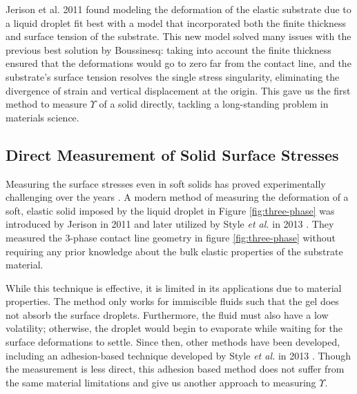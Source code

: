Jerison et al. 2011 \cite{jerison2011deformation} found modeling the deformation of the elastic substrate due to a liquid droplet fit best with a model that incorporated both the finite thickness and surface tension of the substrate. This new model solved many issues with the previous best solution by Boussinesq: taking into account the finite thickness ensured that the deformations would go to zero far from the contact line, and the substrate's surface tension resolves the single stress singularity, eliminating the divergence of strain and vertical displacement at the origin. This gave us the first method to measure $ \Upsilon $ of a solid directly, tackling a long-standing problem in materials science.


\subsection{Direct Measurement of Solid Surface Stresses}
Measuring the surface stresses even in soft solids has proved experimentally challenging over the years \cite{xu2016surface,jensen2015wetting,mondal2015estimation,style2013surface,jagota2012surface,nadermann2013solid,park2014visualization}. A modern method of measuring the deformation of a soft, elastic solid imposed by the liquid droplet in Figure \ref{fig:three-phase} was introduced by Jerison in 2011 \cite{jerison2011deformation} and later utilized by Style \emph{et al.} in 2013 \cite{style2013universal}. They measured the 3-phase contact line geometry in figure \ref{fig:three-phase} without requiring any prior knowledge about the bulk elastic properties of the substrate material. 

While this technique is effective, it is limited in its applications due to material properties. The method only works for immiscible fluids such that the gel does not absorb the surface droplets. Furthermore, the fluid must also have a low volatility; otherwise, the droplet would begin to evaporate while waiting for the surface deformations to settle. Since then, other methods have been developed, including an adhesion-based technique developed by Style \textit{et al.} in 2013 \cite{style2013surface}. Though the measurement is less direct, this adhesion based method does not suffer from the same material limitations and give us another approach to measuring $ \Upsilon $.  



